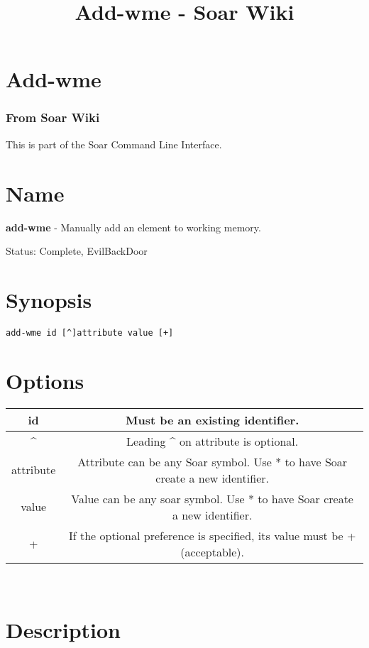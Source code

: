 \documentclass[10pt]{article}
\title{Add-wme - Soar Wiki}
\begin{document}
\section*{Add-wme}
\subsubsection*{From Soar Wiki}


 This is part of the Soar Command Line Interface. 
\section*{ Name }


 \textbf{add-wme}
 - Manually add an element to working memory. 


 Status: Complete, EvilBackDoor
\section*{ Synopsis }


  \begin{verbatim}
add-wme id [^]attribute value [+]

\end{verbatim}



 
\section*{ Options }


\begin{tabular}{|c|c|}
\hline 
 id  & Must be an existing identifier.  \\
 \hline 
 \^{}  & Leading \^{} on attribute is optional.  \\
 \hline 
 attribute  & Attribute can be any Soar symbol. Use * to have Soar create a new identifier.  \\
 \hline 
 value  & Value can be any soar symbol. Use * to have Soar create a new identifier.  \\
 \hline 
 +  & If the optional preference is specified, its value must be + (acceptable).  \\
 \hline 

\end{tabular}



 \\ 

\section*{ Description }
\end{document}
